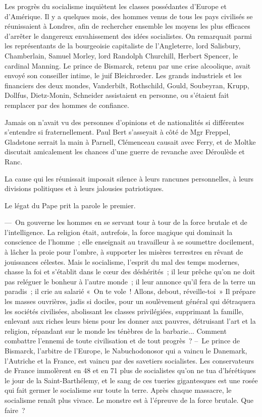 \documentclass[french,twoside]{book} %
\newcommand\chaptercont{} %
\begin{document}
\chaptercont
\noindent Les progrès du socialisme inquiètent les classes possédantes d’Europe et d’Amérique. Il y a quelques mois, des hommes venus de tous les pays civilisés se réunissaient à Londres, afin de rechercher ensemble les moyens les plus efficaces d’arrêter le dangereux envahissement des idées socialistes. On remarquait parmi les représentants de la bourgeoisie capitaliste de l’Angleterre, lord Salisbury, Chamberlain, Samuel Morley, lord Randolph Churchill, Herbert Spencer, le cardinal Manning. Le prince de Bismarck, retenu par une crise alcoolique, avait envoyé son conseiller intime, le juif Bleichrœder. Les grands industriels et les financiers des deux mondes, Vanderbilt, Rothschild, Gould, Soubeyran, Krupp, Dollfus, Dietz-Monin, Schneider assistaient en personne, ou s’étaient fait remplacer par des hommes de confiance.\par
Jamais on n’avait vu des personnes d’opinions et de nationalités si différentes s’entendre si fraternellement. Paul Bert s’asseyait à côté de Mgr Freppel, Gladstone serrait la main à Parnell, Clémenceau causait avec Ferry, et de Moltke discutait amicalement les chances d’une guerre de revanche avec Déroulède et Ranc.\par
La cause qui les réunissait imposait silence à leurs rancunes personnelles, à leurs divisions politiques et à leurs jalousies patriotiques.\par
Le légat du Pape prit la parole le premier.\par
— On gouverne les hommes en se servant tour à tour de la force brutale et de l’intelligence. La religion était, autrefois, la force magique qui dominait la conscience de l’homme ; elle enseignait au travailleur à se soumettre docilement, à lâcher la proie pour l’ombre, à supporter les misères terrestres en rêvant de jouissances célestes. Mais le socialisme, l’esprit du mal des temps modernes, chasse la foi et s’établit dans le cœur des déshérités ; il leur prêche qu’on ne doit pas reléguer le bonheur à l’autre monde ; il leur annonce qu’il fera de la terre un paradis ; il crie au salarié « On te vole ! Allons, debout, réveille-toi » Il prépare les masses ouvrières, jadis si dociles, pour un soulèvement général qui détraquera les sociétés civilisées, abolissant les classes privilégiées, supprimant la famille, enlevant aux riches leurs biens pour les donner aux pauvres, détruisant l’art et la religion, répandant sur le monde les ténèbres de la barbarie... Comment combattre l’ennemi de toute civilisation et de tout progrès ? – Le prince de Bismarck, l’arbitre de l’Europe, le Nabuchodonosor qui a vaincu le Danemark, l’Autriche et la France, est vaincu par des savetiers socialistes. Les conservateurs de France immolèrent en 48 et en 71 plus de socialistes qu’on ne tua d’hérétiques le jour de la Saint-Barthélemy, et le sang de ces tueries gigantesques est une rosée qui fait germer le socialisme sur toute la terre. Après chaque massacre, le socialisme renaît plus vivace. Le monstre est à l’épreuve de la force brutale. Que faire ?\par
\end{document}
